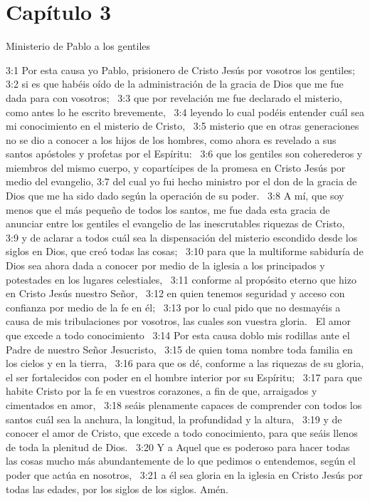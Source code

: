 \section*{Capítulo 3}
Ministerio de Pablo a los gentiles  

3:1 Por esta causa yo Pablo, prisionero de Cristo Jesús por vosotros los gentiles;  
3:2 si es que habéis oído de la administración de la gracia de Dios que me fue dada para con vosotros;  
3:3 que por revelación me fue declarado el misterio, como antes lo he escrito brevemente,  
3:4 leyendo lo cual podéis entender cuál sea mi conocimiento en el misterio de Cristo,  
3:5 misterio que en otras generaciones no se dio a conocer a los hijos de los hombres, como ahora es revelado a sus santos apóstoles y profetas por el Espíritu:  
3:6 que los gentiles son coherederos y miembros del mismo cuerpo, y copartícipes de la promesa en Cristo Jesús por medio del evangelio, 
3:7 del cual yo fui hecho ministro por el don de la gracia de Dios que me ha sido dado según la operación de su poder.  
3:8 A mí, que soy menos que el más pequeño de todos los santos, me fue dada esta gracia de anunciar entre los gentiles el evangelio de las inescrutables riquezas de Cristo,  
3:9 y de aclarar a todos cuál sea la dispensación del misterio escondido desde los siglos en Dios, que creó todas las cosas;  
3:10 para que la multiforme sabiduría de Dios sea ahora dada a conocer por medio de la iglesia a los principados y potestades en los lugares celestiales,  
3:11 conforme al propósito eterno que hizo en Cristo Jesús nuestro Señor,  
3:12 en quien tenemos seguridad y acceso con confianza por medio de la fe en él;  
3:13 por lo cual pido que no desmayéis a causa de mis tribulaciones por vosotros, las cuales son vuestra gloria.  
El amor que excede a todo conocimiento  
3:14 Por esta causa doblo mis rodillas ante el Padre de nuestro Señor Jesucristo,  
3:15 de quien toma nombre toda familia en los cielos y en la tierra,  
3:16 para que os dé, conforme a las riquezas de su gloria, el ser fortalecidos con poder en el hombre interior por su Espíritu;  
3:17 para que habite Cristo por la fe en vuestros corazones, a fin de que, arraigados y cimentados en amor,  
3:18 seáis plenamente capaces de comprender con todos los santos cuál sea la anchura, la longitud, la profundidad y la altura,  
3:19 y de conocer el amor de Cristo, que excede a todo conocimiento, para que seáis llenos de toda la plenitud de Dios.  
3:20 Y a Aquel que es poderoso para hacer todas las cosas mucho más abundantemente de lo que pedimos o entendemos, según el poder que actúa en nosotros,  
3:21 a él sea gloria en la iglesia en Cristo Jesús por todas las edades, por los siglos de los siglos. Amén.  
